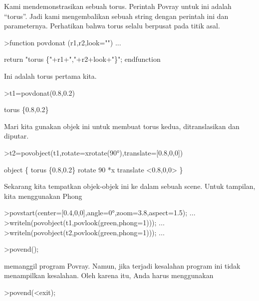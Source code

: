 \documentclass[a4paper,10pt]{article}
\begin{document}
\begin{eulernotebook}
\begin{eulercomment}
\begin{eulercomment}
\begin{eulercomment}
\begin{eulercomment}
\begin{eulercomment}
\begin{eulercomment}
\begin{eulercomment}
\begin{eulercomment}
\begin{eulercomment}
\begin{eulercomment}
\begin{eulercomment}
Kami mendemonstrasikan sebuah torus. Perintah Povray untuk ini adalah
“torus”. Jadi kami mengembalikan sebuah string dengan perintah ini dan
parameternya. Perhatikan bahwa torus selalu berpusat pada titik asal.
\end{eulercomment}
\begin{eulerprompt}
>function povdonat (r1,r2,look="") ...
\end{eulerprompt}
\begin{eulerudf}
    return "torus \{"+r1+","+r2+look+"\}";
  endfunction
\end{eulerudf}
\begin{eulercomment}
Ini adalah torus pertama kita.
\end{eulercomment}
\begin{eulerprompt}
>t1=povdonat(0.8,0.2)
\end{eulerprompt}
\begin{euleroutput}
  torus \{0.8,0.2\}
\end{euleroutput}
\begin{eulercomment}
Mari kita gunakan objek ini untuk membuat torus kedua, ditranslasikan
dan diputar.
\end{eulercomment}
\begin{eulerprompt}
>t2=povobject(t1,rotate=xrotate(90°),translate=[0.8,0,0])
\end{eulerprompt}
\begin{euleroutput}
  object \{ torus \{0.8,0.2\}
   rotate 90 *x 
   translate <0.8,0,0>
   \}
\end{euleroutput}
\begin{eulercomment}
Sekarang kita tempatkan objek-objek ini ke dalam sebuah scene. Untuk
tampilan, kita menggunakan Phong
\end{eulercomment}
\begin{eulerprompt}
>povstart(center=[0.4,0,0],angle=0°,zoom=3.8,aspect=1.5); ...
>writeln(povobject(t1,povlook(green,phong=1))); ...
>writeln(povobject(t2,povlook(green,phong=1))); ...
\end{eulerprompt}
\begin{eulerttcomment}
 >povend();
\end{eulerttcomment}
\begin{eulercomment}
memanggil program Povray. Namun, jika terjadi kesalahan program ini
tidak\\
menampilkan kesalahan. Oleh karena itu, Anda harus menggunakan

\end{eulercomment}
\begin{eulerttcomment}
 >povend(<exit);
\end{eulerttcomment}
\begin{eulercomment}


\end{eulercomment}
\end{eulercomment}
\end{eulercomment}
\end{eulercomment}
\end{eulercomment}
\end{eulercomment}
\end{eulercomment}
\end{eulercomment}
\end{eulercomment}
\end{eulercomment}
\end{eulercomment}
\end{eulernotebook}
\end{document}
